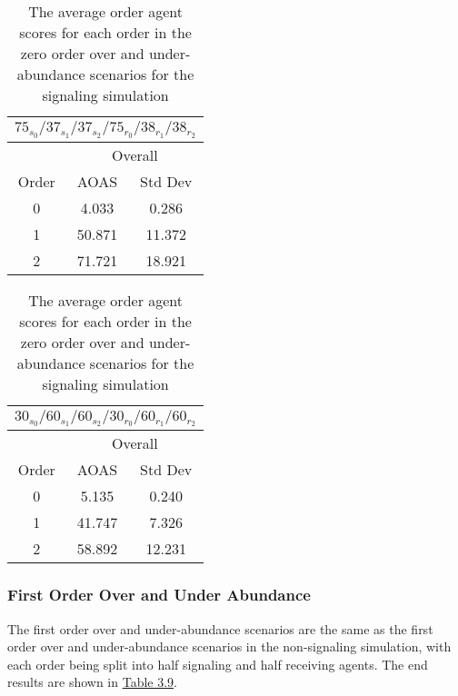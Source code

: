 \begin{table}[h]
    \centering
    \begin{tabular}{|c|c|c|}
    \hline
    \multicolumn{3}{|c|}{$75_{s_{0}}/37_{s_{1}}/37_{s_{2}}/75_{r_{0}}/38_{r_{1}}/38_{r_{2}}$} \\
    \hline
    \multicolumn{1}{|c|}{} & \multicolumn{2}{|c|}{Overall} \\
    \hline
    Order & AOAS & Std Dev \\
    \hline
    0     & 4.033   & 0.286    \\
    1     & 50.871  & 11.372   \\
    2     & 71.721  & 18.921   \\
    \hline
\end{tabular}
\qquad
\begin{tabular}{|c|c|c|}
    \hline
    \multicolumn{3}{|c|}{$30_{s_{0}}/60_{s_{1}}/60_{s_{2}}/30_{r_{0}}/60_{r_{1}}/60_{r_{2}}$} \\
    \hline
    \multicolumn{1}{|c|}{} & \multicolumn{2}{|c|}{Overall} \\
    \hline
    Order & AOAS & Std Dev \\
    \hline
    0     & 5.135   & 0.240    \\
    1     & 41.747  & 7.326   \\
    2     & 58.892  & 12.231   \\
    \hline
\end{tabular}
\caption{The average order agent scores for each order in the zero order over and under-abundance scenarios for the signaling simulation}
\label{table:sig-zero-order-overall}
\end{table}

\subsubsection{First Order Over and Under Abundance}

The first order over and under-abundance scenarios are the same as the first order over and under-abundance scenarios in the non-signaling simulation, with each order being split into half signaling and half receiving agents. The end results are shown in \hyperref[table:sig-first-order-simple]{Table 3.9}.

